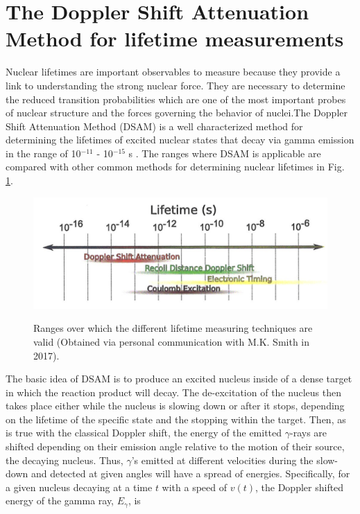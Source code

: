 \section{The Doppler Shift Attenuation Method for lifetime measurements}
\label{sec: dsam-intro}


Nuclear lifetimes are important observables to measure because they provide a link to understanding the strong nuclear force. They are necessary to determine the reduced transition probabilities which are one of the most important probes of nuclear structure and the forces governing the behavior of nuclei.The Doppler Shift Attenuation Method (DSAM) is a well characterized method for determining the lifetimes of excited nuclear states that decay via gamma emission in the range of 10$^{-11}$ - 10$^{-15}$ s \cite{Blaugrund1966}. The ranges where DSAM is applicable are compared with other common methods for determining nuclear lifetimes in Fig. \ref{fig: lifetimeRanges}. 


\begin{figure}
\includegraphics[width=\linewidth]{figures/lifetimeTechniques.png}
\label{fig: lifetimeRanges}
\caption{Ranges over which the different lifetime measuring techniques are valid (Obtained via personal communication with M.K. Smith in 2017).}
\end{figure}


The basic idea of DSAM is to produce an excited nucleus inside of a dense target in which the reaction product will decay. The de-excitation of the nucleus then takes place either while the nucleus is slowing down or after it stops, depending on the lifetime of the specific state and the stopping within the target. Then, as is true with the classical Doppler shift, the energy of the emitted $\gamma$-rays are shifted depending on their emission angle relative to the motion of their source, the decaying nucleus. Thus, $\gamma$'s emitted at different velocities during the slow-down and detected at given angles will have a spread of energies. Specifically, for a given nucleus decaying at a time $t$ with a speed of $v(t)$, the Doppler shifted energy of the gamma ray, $E_{\gamma}$, is 

